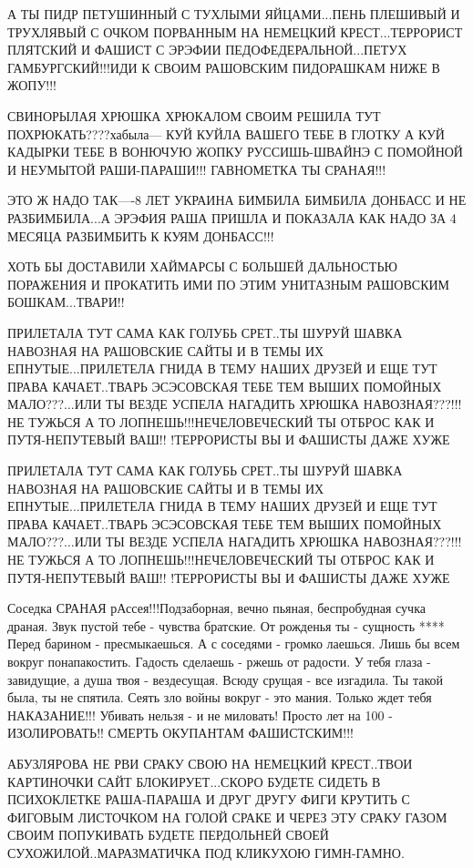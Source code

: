А ТЫ ПИДР ПЕТУШИННЫЙ С ТУХЛЫМИ ЯЙЦАМИ...ПЕНЬ ПЛЕШИВЫЙ И ТРУХЛЯВЫЙ С ОЧКОМ
ПОРВАННЫМ НА НЕМЕЦКИЙ КРЕСТ...ТЕРРОРИСТ ПЛЯТСКИЙ И ФАШИСТ С ЭРЭФИИ
ПЕДОФЕДЕРАЛЬНОЙ...ПЕТУХ ГАМБУРГСКИЙ!!!ИДИ К СВОИМ РАШОВСКИМ ПИДОРАШКАМ НИЖЕ В
ЖОПУ!!!

СВИНОРЫЛАЯ ХРЮШКА ХРЮКАЛОМ СВОИМ РЕШИЛА ТУТ ПОХРЮКАТЬ????хабыла--- КУЙ КУЙЛА
ВАШЕГО ТЕБЕ В ГЛОТКУ А КУЙ КАДЫРКИ ТЕБЕ В ВОНЮЧУЮ ЖОПКУ РУССИШЬ-ШВАЙНЭ С
ПОМОЙНОЙ И НЕУМЫТОЙ РАШИ-ПАРАШИ!!! ГАВНОМЕТКА ТЫ СРАНАЯ!!!        

ЭТО Ж НАДО ТАК----8 ЛЕТ УКРАИНА БИМБИЛА БИМБИЛА ДОНБАСС И НЕ РАЗБИМБИЛА...А
ЭРЭФИЯ РАША ПРИШЛА И ПОКАЗАЛА КАК НАДО ЗА 4 МЕСЯЦА РАЗБИМБИТЬ К КУЯМ ДОНБАСС!!!

ХОТЬ БЫ ДОСТАВИЛИ ХАЙМАРСЫ С БОЛЬШЕЙ ДАЛЬНОСТЬЮ ПОРАЖЕНИЯ И ПРОКАТИТЬ ИМИ ПО
ЭТИМ УНИТАЗНЫМ РАШОВСКИМ БОШКАМ...ТВАРИ!!

ПРИЛЕТАЛА ТУТ САМА КАК ГОЛУБЬ СРЕТ..ТЫ ШУРУЙ ШАВКА НАВОЗНАЯ НА РАШОВСКИЕ САЙТЫ
И В ТЕМЫ ИХ ЕПНУТЫЕ...ПРИЛЕТЕЛА ГНИДА В ТЕМУ НАШИХ ДРУЗЕЙ И ЕЩЕ ТУТ ПРАВА
КАЧАЕТ..ТВАРЬ ЭСЭСОВСКАЯ ТЕБЕ ТЕМ ВЫШИХ ПОМОЙНЫХ МАЛО???...ИЛИ ТЫ ВЕЗДЕ УСПЕЛА
НАГАДИТЬ ХРЮШКА НАВОЗНАЯ???!!!НЕ ТУЖЬСЯ А ТО ЛОПНЕШЬ!!!НЕЧЕЛОВЕЧЕСКИЙ ТЫ ОТБРОС
КАК И ПУТЯ-НЕПУТЕВЫЙ ВАШ!! !ТЕРРОРИСТЫ ВЫ И ФАШИСТЫ ДАЖЕ ХУЖЕ                                             

ПРИЛЕТАЛА ТУТ САМА КАК ГОЛУБЬ СРЕТ..ТЫ ШУРУЙ ШАВКА НАВОЗНАЯ НА РАШОВСКИЕ САЙТЫ
И В ТЕМЫ ИХ ЕПНУТЫЕ...ПРИЛЕТЕЛА ГНИДА В ТЕМУ НАШИХ ДРУЗЕЙ И ЕЩЕ ТУТ ПРАВА
КАЧАЕТ..ТВАРЬ ЭСЭСОВСКАЯ ТЕБЕ ТЕМ ВЫШИХ ПОМОЙНЫХ МАЛО???...ИЛИ ТЫ ВЕЗДЕ УСПЕЛА
НАГАДИТЬ ХРЮШКА НАВОЗНАЯ???!!!НЕ ТУЖЬСЯ А ТО ЛОПНЕШЬ!!!НЕЧЕЛОВЕЧЕСКИЙ ТЫ ОТБРОС
КАК И ПУТЯ-НЕПУТЕВЫЙ ВАШ!! !ТЕРРОРИСТЫ ВЫ И ФАШИСТЫ ДАЖЕ ХУЖЕ                                                             

Соседка СРАНАЯ рАссея!!!Подзаборная, вечно пьяная, беспробудная сучка драная.
Звук пустой тебе - чувства братские. От рожденья ты - сущность **** Перед
барином - пресмыкаешься. А с соседями - громко лаешься. Лишь бы всем вокруг
понапакостить. Гадость сделаешь - ржешь от радости. У тебя глаза - завидущие, а
душа твоя - вездесущая. Всюду срущая - все изгадила. Ты такой была, ты не
спятила. Сеять зло войны вокруг - это мания. Только ждет тебя НАКАЗАНИЕ!!!
Убивать нельзя - и не миловать! Просто лет на 100 - ИЗОЛИРОВАТЬ!! СМЕРТЬ
ОКУПАНТАМ ФАШИСТСКИМ!!!

АБУЗЛЯРОВА НЕ РВИ СРАКУ СВОЮ НА НЕМЕЦКИЙ КРЕСТ..ТВОИ КАРТИНОЧКИ САЙТ
БЛОКИРУЕТ...СКОРО БУДЕТЕ СИДЕТЬ В ПСИХОКЛЕТКЕ РАША-ПАРАША И ДРУГ ДРУГУ ФИГИ
КРУТИТЬ С ФИГОВЫМ ЛИСТОЧКОМ НА  ГОЛОЙ СРАКЕ И ЧЕРЕЗ ЭТУ СРАКУ ГАЗОМ СВОИМ
ПОПУКИВАТЬ БУДЕТЕ ПЕРДОЛЬНЕЙ СВОЕЙ СУХОЖИЛОЙ..МАРАЗМАТИЧКА ПОД КЛИКУХОЮ
ГИМН-ГАМНО.

